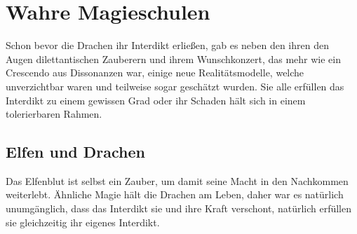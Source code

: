 \documentclass[a4paper,12pt,oneside]{book}
\begin{document}
\chapter{Wahre Magieschulen}
Schon bevor die Drachen ihr Interdikt erließen, gab es neben den ihren den Augen dilettantischen Zauberern und ihrem Wunschkonzert, das mehr wie ein Crescendo aus Dissonanzen war, einige neue Realitätsmodelle, welche unverzichtbar waren und teilweise sogar geschätzt wurden. Sie alle erfüllen das Interdikt zu einem gewissen Grad oder ihr Schaden hält sich in einem tolerierbaren Rahmen.

\section{Elfen und Drachen}
Das Elfenblut ist selbst ein Zauber, um damit seine Macht in den Nachkommen weiterlebt. Ähnliche Magie hält die Drachen am Leben, daher war es natürlich unumgänglich, dass das Interdikt sie und ihre Kraft verschont, natürlich erfüllen sie gleichzeitig ihr eigenes Interdikt.
\end{document}
